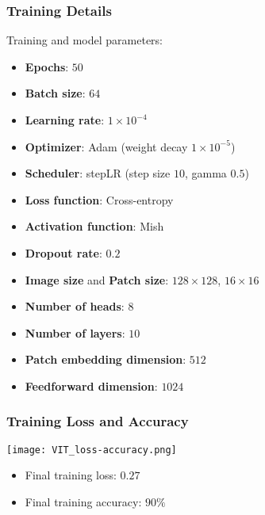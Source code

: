 \documentclass[../presentation.tex]{subfiles} %
\begin{document}
\begin{frame}
    
    \frametitle{Training Details}

    Training and model parameters:
    \vspace{0.1cm}
    \begin{itemize}
        \item \textbf{Epochs}: $50$
        \item \textbf{Batch size}: $64$
        \item \textbf{Learning rate}: $1\times10^{-4}$
        \item \textbf{Optimizer}: Adam (weight decay $1\times10^{-5}$)
        \item \textbf{Scheduler}: stepLR (step size $10$, gamma $0.5$)
        \item \textbf{Loss function}: Cross-entropy
        \item \textbf{Activation function}: Mish
        \item \textbf{Dropout rate}: $0.2$
        \item \textbf{Image size} and \textbf{Patch size}: $128\times128$, $16\times16$
        \item \textbf{Number of heads}: $8$
        \item \textbf{Number of layers}: $10$
        \item \textbf{Patch embedding dimension}: $512$
        \item \textbf{Feedforward dimension}: $1024$
    \end{itemize}

\end{frame}

\begin{frame}
    
    \frametitle{Training Loss and Accuracy}

    \begin{center}
        \texttt{[image: VIT\_loss-accuracy.png]}
    \end{center}

    \small{
    \begin{cbox}
        \begin{itemize}
            \item Final training loss: $0.27$
            \item Final training accuracy: $90\%$
        \end{itemize}
    \end{cbox}
    }

\end{frame}
\end{document}
